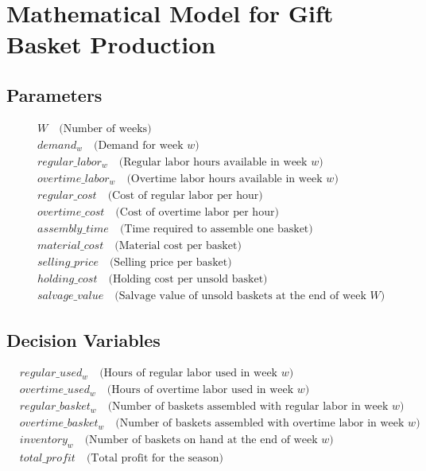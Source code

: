 \documentclass{article}
\begin{document}
\section*{Mathematical Model for Gift Basket Production}

\subsection*{Parameters}
\begin{align*}
& W \quad \text{(Number of weeks)} \\
& demand_w \quad \text{(Demand for week } w \text{)} \\
& regular\_labor_w \quad \text{(Regular labor hours available in week } w \text{)} \\
& overtime\_labor_w \quad \text{(Overtime labor hours available in week } w \text{)} \\
& regular\_cost \quad \text{(Cost of regular labor per hour)} \\
& overtime\_cost \quad \text{(Cost of overtime labor per hour)} \\
& assembly\_time \quad \text{(Time required to assemble one basket)} \\
& material\_cost \quad \text{(Material cost per basket)} \\
& selling\_price \quad \text{(Selling price per basket)} \\
& holding\_cost \quad \text{(Holding cost per unsold basket)} \\
& salvage\_value \quad \text{(Salvage value of unsold baskets at the end of week } W \text{)}
\end{align*}

\subsection*{Decision Variables}
\begin{align*}
& regular\_used_w \quad \text{(Hours of regular labor used in week } w \text{)} \\
& overtime\_used_w \quad \text{(Hours of overtime labor used in week } w \text{)} \\
& regular\_basket_w \quad \text{(Number of baskets assembled with regular labor in week } w \text{)} \\
& overtime\_basket_w \quad \text{(Number of baskets assembled with overtime labor in week } w \text{)} \\
& inventory_w \quad \text{(Number of baskets on hand at the end of week } w \text{)} \\
& total\_profit \quad \text{(Total profit for the season)}
\end{align*}
\end{document}
